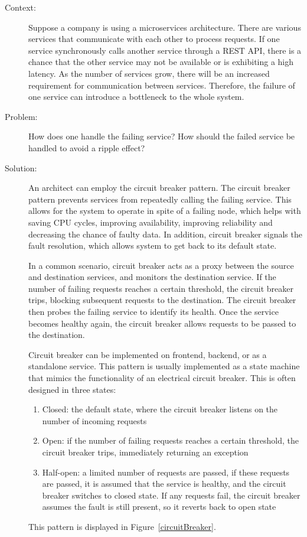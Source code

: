 \documentclass{bmcart}
\begin{document}
\begin{description}
  \item[Context:] Suppose a company is using a microservices architecture. There are various services that communicate with each other to process requests. If one service synchronously calls another service through a REST API, there is a chance that the other service may not be available or is exhibiting a high latency. As the number of services grow, there will be an increased requirement for communication between services. Therefore, the failure of one service can introduce a bottleneck to the whole system.
  \item[Problem:] How does one handle the failing service? How should the failed service be handled to avoid a ripple effect? 
  \item[Solution:] An architect can employ the circuit breaker pattern. The circuit breaker pattern prevents services from repeatedly calling the failing service. This allows for the system to operate in spite of a failing node, which helps with saving CPU cycles, improving availability, improving reliability and decreasing the chance of faulty data. In addition, circuit breaker signals the fault resolution, which allows system to get back to its default state. 

  In a common scenario, circuit breaker acts as a proxy between the source and destination services, and monitors the destination service. If the number of failing requests reaches a certain threshold, the circuit breaker trips, blocking subsequent requests to the destination. The circuit breaker then probes the failing service to identify its health. Once the service becomes healthy again, the circuit breaker allows requests to be passed to the destination. 
  
  Circuit breaker can be implemented on frontend, backend, or as a standalone service. This pattern is usually implemented as a state machine that mimics the functionality of an electrical circuit breaker. This is often designed in three states: 
  \begin{enumerate}
    \item Closed: the default state, where the circuit breaker listens on the number of incoming requests
    \item Open: if the number of failing requests reaches a certain threshold, the circuit breaker trips, immediately returning an exception
    \item Half-open: a limited number of requests are passed, if these requests are passed, it is assumed that the service is healthy, and the circuit breaker switches to closed state. If any requests fail, the circuit breaker assumes the fault is still present, so it reverts back to open state
  \end{enumerate}
  
  This pattern is displayed in Figure~\ref{circuitBreaker}.   
\end{description}
\end{document}

